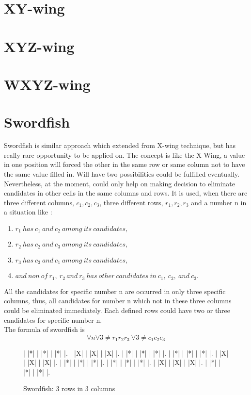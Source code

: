 \documentclass[11pt]{report}
\begin{document}
\section{XY-wing}
\label{sec:XY-wing}


\section{XYZ-wing}
\label{sec:XYZ-wing}


\section{WXYZ-wing}
\label{sec:WXYZ-wing}


\section{Swordfish}
\label{sec:Swordfish}
Swordfish is similar approach which extended from X-wing technique, but has really rare opportunity to be applied on. The concept is like the X-Wing, a value in one position will forced the other in the same row or same column not to have the same value filled in. Will have two possibilities could be fulfilled eventually. Nevertheless, at the moment, could only help on making decision to eliminate candidates in other cells in the same columns and rows. It is used, when there are three different columns, $c_{1}, c_{2}, c_{3}$, three different rows, $r_{1}, r_{2}, r_{3}$ and a number n in a situation like :
\begin{enumerate}
\item $r_{1}\ has\ c_{1}\ and\ c_{2}\ among\ its\ candidates,$
\item $r_{2}\ has\ c_{2}\ and\ c_{3}\ among\ its\ candidates,$
\item $r_{3}\ has\ c_{3}\ and\ c_{1}\ among\ its\ candidates,$
\item $and\ non\ of\ r_{1},\ r_{2}\, and\ r_{3}\ has\ other\ candidates\ in\ c_{1},\ c_{2},\ and\ c_{3}.$
\end{enumerate}
All the candidates for specific number n are occurred in only three specific columns, thus, all candidates for number n which not in these three columns could be eliminated immediately. Each defined rows could have two or three candidates for specific number n.\\
The formula of swordfish is
\[ \forall n \forall 3 \neq r_{1} r_{2} r_{3}\ \forall 3 \neq c_{1} c_{2} c_{3}\]
\begin{figure}
\begin{sudoku}
| |*| | |*| | |*| |.
| |X| | |X| | |X| |.
| |*| | |*| | |*| |.
| |*| | |*| | |*| |.
| |X| | |X| | |X| |.
| |*| | |*| | |*| |.
| |*| | |*| | |*| |.
| |X| | |X| | |X| |.
| |*| | |*| | |*| |.
\end{sudoku}
\caption{Swordfish: 3 rows in 3 columns}
\label{fig:swordfish33}
\end{figure}
\end{document}

